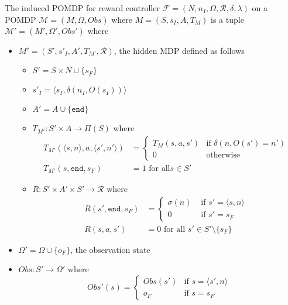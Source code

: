 
\begin{definition}
	\label{def:reward-mdp}
	The induced POMDP for reward controller $\mathcal{F}=(N, n_I, \Omega, \mathcal{R}, \delta, \lambda)$ on a POMDP $\mathcal{M}=(M,\Omega,Obs)$ where $M=(S,s_I,A,T_{M})$ is a tuple $\mathcal{M'}=(M',\Omega',Obs')$ where 
	\begin{itemize}
		\item $M' = (S',s'_I,A',T_{M'},\mathcal{R})$, the hidden MDP defined as follows
		\begin{itemize}
			\item $S'=S\times N \cup \{s_F\}$
			\item $s'_I = \langle s_I, \delta(n_I, O(s_I))\rangle$
			\item $A'=A\cup \{\texttt{end}\}$
			\item $T_{M'}:S'\times A \to \Pi(S)$ where
				\begin{align*}
					T_{M'}(\langle s,n\rangle,a,\langle s',n'\rangle) &= \begin{cases}
						T_M(s,a,s') & \text{if } \delta(n,O(s')=n') \\
						0 & \text{otherwise}
					\end{cases}\\
					T_{M'}(s,\texttt{end},s_F) &= 1 \text{ for all} s\in S'
				\end{align*}
			\item $R:S'\times A'\times S' \to \mathcal{R}$ where 
                \begin{align*}
					R(s',\texttt{end},s_F) &= 
					\begin{cases}
						\sigma(n) & \text{ if } s'=\langle s,n\rangle \\
						0         & \text{ if } s'=s_F
					\end{cases}
					\\
					R(s,a,s') &= 0 \text{ for all } s'\in S'\setminus \{s_F\}
				\end{align*}
		\end{itemize}
		\item $\Omega'=\Omega \cup \{o_F\}$, the observation state
		\item $Obs:S'\to \Omega'$ where 
			\begin{equation*}
				Obs'(s)= \begin{cases}
				Obs(s') & \text{if } s=\langle s',n\rangle\\
				o_F & \text{if } s=s_F
				\end{cases}
			\end{equation*}
		\end{itemize}
\end{definition}


